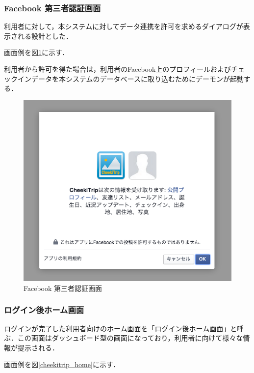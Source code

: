 \documentclass{jsarticle}
\begin{document}
\subsubsection{Facebook 第三者認証画面}

利用者に対して，本システムに対してデータ連携を許可を求めるダイアログが表示される設計とした．

画面例を図\ref{screen_auth_with_facebook}に示す．

利用者から許可を得た場合は，利用者のFacebook上のプロフィールおよびチェックインデータを本システムのデータベースに取り込むためにデーモンが起動する．

\begin{figure}[!ht]
\begin{center}
\includegraphics[width=12cm]{./image/cheekitrip_auth_with_facebook.png}
\caption{Facebook 第三者認証画面}
\label{screen_auth_with_facebook}
\end{center}
\end{figure}

\subsubsection{ログイン後ホーム画面}

ログインが完了した利用者向けのホーム画面を「ログイン後ホーム画面」と呼ぶ．この画面はダッシュボード型の画面になっており，利用者に向けて様々な情報が提示される．

画面例を図\ref{cheekitrip_home}に示す．
\end{document}

